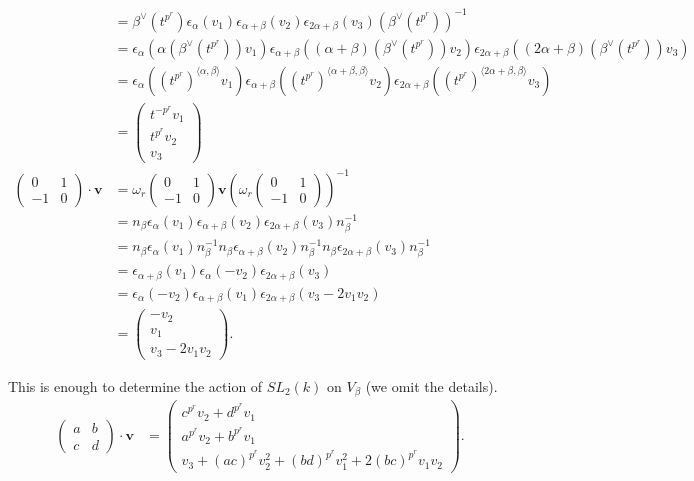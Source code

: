 \begin{align*}
&= \beta^\vee(t^{p^r}) \epsilon_\alpha (v_1)
\epsilon_{\alpha+\beta}(v_2)
\epsilon_{2\alpha+\beta}(v_3) (\beta^\vee(t^{p^r}))^{-1} \\
&= \epsilon_\alpha \left(\alpha(\beta^\vee(t^{p^r}))v_1\right)
\epsilon_{\alpha+\beta} \left((\alpha+\beta)(\beta^\vee(t^{p^r}))v_2 \right)
\epsilon_{2\alpha+\beta} \left((2\alpha+\beta)(\beta^\vee(t^{p^r}))v_3 \right)\\
&= \epsilon_\alpha \left((t^{p^r})^{\langle \alpha, \beta \rangle}v_1 \right)
\epsilon_{\alpha+\beta} \left((t^{p^r})^{\langle \alpha+\beta, \beta \rangle}v_2 \right)
\epsilon_{2\alpha+\beta} \left((t^{p^r})^{\langle 2\alpha+\beta, \beta \rangle}v_3 \right)\\
&= \left(\begin{matrix} t^{-p^r}v_1 \\ t^{p^r}v_2\\ v_3 \end{matrix}\right) \\
\left(\begin{matrix} 0 & 1 \\ -1 & 0 \end{matrix}\right) \cdot \mathbf{v} &=
\omega_r\left(\begin{matrix} 0 & 1 \\ -1 & 0\end{matrix}\right) \mathbf{v}\left( \omega_r\left(\begin{matrix} 0 & 1 \\ -1 & 0\end{matrix}\right)\right)^{-1} \\
&= n_\beta  \epsilon_\alpha (v_1)\epsilon_{\alpha+\beta}(v_2) \epsilon_{2\alpha+\beta}(v_3) n_\beta^{-1}\\
&= n_\beta  \epsilon_\alpha (v_1) n_\beta^{-1}n_\beta \epsilon_{\alpha+\beta}(v_2) n_\beta^{-1} n_\beta \epsilon_{2\alpha+\beta}(v_3) n_\beta^{-1}\\
&= \epsilon_{\alpha+\beta} (v_1) \epsilon_{\alpha}(-v_2)  \epsilon_{2\alpha+\beta}(v_3) \\
&=\epsilon_{\alpha}(-v_2)  \epsilon_{\alpha+\beta} (v_1)  \epsilon_{2\alpha+\beta}(v_3 - 2v_1v_2) \\
&= \left(\begin{matrix} -v_2 \\ v_1 \\ v_3 - 2v_1v_2 \end{matrix}\right).
\end{align*}

This is enough to determine the action of $SL_2(k)$ on $V_\beta$ (we omit the details).
\begin{align*}
\left(\begin{matrix}
a & b \\ c & d
\end{matrix} \right) \cdot \mathbf{v} &=
\left(\begin{matrix}
c^{p^r}v_2 + d^{p^r}v_1 \\
a^{p^r}v_2 + b^{p^r}v_1 \\
v_3 + (ac)^{p^r}v_2^2 + (bd)^{p^r}v_1^2 + 2(bc)^{p^r}v_1v_2
\end{matrix}\right).
\end{align*}

